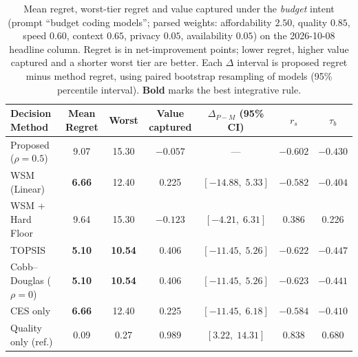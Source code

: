 \documentclass[pdflatex,sn-mathphys-num]{sn-jnl}
\theoremstyle{thmstyleone}
\theoremstyle{thmstylethree}
\begin{document}
\begin{table}[!htbp]
\caption{Mean regret, worst-tier regret and value captured under the \emph{budget} intent (prompt ``budget coding models''; parsed weights: affordability $2.50$, quality $0.85$, speed $0.60$, context $0.65$, privacy $0.05$, availability $0.05$) on the 2026-10-08 headline column. Regret is in net-improvement points; lower regret, higher value captured and a shorter worst tier are better. Each $\Delta$ interval is proposed regret minus method regret, using paired bootstrap resampling of models (95\% percentile interval). \textbf{Bold} marks the best integrative rule.}\label{tab:regret_budget}
\centering
\footnotesize
\setlength{\tabcolsep}{2pt}
\begin{tabular*}{\linewidth}{@{\extracolsep{\fill}}lcccccc@{}}
\toprule
\textbf{Decision Method} & \textbf{Mean Regret} & \textbf{Worst} & \textbf{Value captured} & \textbf{$\Delta_{P-M}$ (95\% CI)} & \textbf{$r_s$} & \textbf{$\tau_b$} \\
\midrule
Proposed ($\rho{=}0.5$)    & 9.07 & 15.30 & $-0.057$ & --- & $-0.602$ & $-0.430$ \\
WSM (Linear)               & \textbf{6.66} & 12.40 & 0.225 & $[-14.88,\;5.33]$ & $-0.582$ & $-0.404$ \\
WSM + Hard Floor           & 9.64 & 15.30 & $-0.123$ & $[-4.21,\;6.31]$ & 0.386 & 0.226 \\
TOPSIS                     & \textbf{5.10} & \textbf{10.54} & 0.406 & $[-11.45,\;5.26]$ & $-0.622$ & $-0.447$ \\
Cobb--Douglas ($\rho{=}0$) & \textbf{5.10} & \textbf{10.54} & 0.406 & $[-11.45,\;5.26]$ & $-0.623$ & $-0.441$ \\
CES only                   & \textbf{6.66} & 12.40 & 0.225 & $[-11.45,\;6.18]$ & $-0.584$ & $-0.410$ \\
\midrule
Quality only (ref.)        & 0.09 & 0.27 & 0.989 & $[3.22,\;14.31]$ & 0.838 & 0.680 \\
\bottomrule
\end{tabular*}
\end{table}
\end{document}
